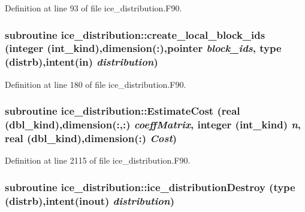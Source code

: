 Definition at line 93 of file ice\_\-distribution.F90.\hypertarget{namespaceice__distribution_a8f328e752d1852d365225748260e0729}{
\subsubsection[{create\_\-local\_\-block\_\-ids}]{\setlength{\rightskip}{0pt plus 5cm}subroutine ice\_\-distribution::create\_\-local\_\-block\_\-ids (integer (int\_\-kind),dimension(:),pointer {\em block\_\-ids}, \/  type (distrb),intent(in) {\em distribution})}}
\label{namespaceice__distribution_a8f328e752d1852d365225748260e0729}


Definition at line 180 of file ice\_\-distribution.F90.\hypertarget{namespaceice__distribution_ad81ef2e05e7990db5bd6ed4d80cc6761}{
\subsubsection[{EstimateCost}]{\setlength{\rightskip}{0pt plus 5cm}subroutine ice\_\-distribution::EstimateCost (real (dbl\_\-kind),dimension(:,:) {\em coeffMatrix}, \/  integer (int\_\-kind) {\em n}, \/  real (dbl\_\-kind),dimension(:) {\em Cost})}}
\label{namespaceice__distribution_ad81ef2e05e7990db5bd6ed4d80cc6761}


Definition at line 2115 of file ice\_\-distribution.F90.\hypertarget{namespaceice__distribution_ae535b4181fd7a39a623c9b02de3c1fcf}{
\subsubsection[{ice\_\-distributionDestroy}]{\setlength{\rightskip}{0pt plus 5cm}subroutine ice\_\-distribution::ice\_\-distributionDestroy (type (distrb),intent(inout) {\em distribution})}}
\label{namespaceice__distribution_ae535b4181fd7a39a623c9b02de3c1fcf}


